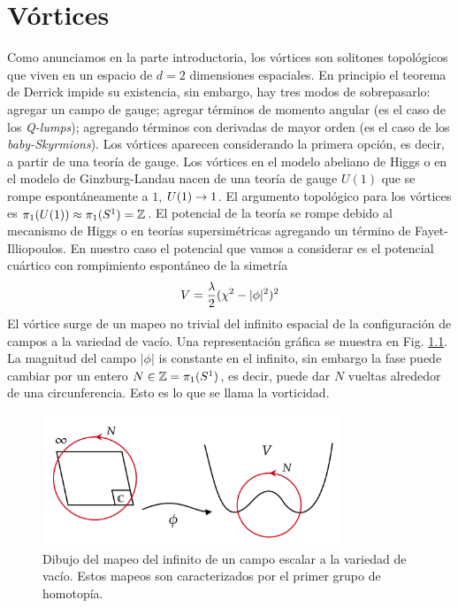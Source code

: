 
\chapter{Vórtices} %

\label{ch:ch2} %


Como anunciamos en la parte introductoria, los vórtices son solitones topológicos que viven en un espacio de $d=2$ dimensiones espaciales. En principio el teorema de Derrick impide su existencia, sin embargo, hay tres modos de sobrepasarlo: agregar un campo de gauge; agregar términos de momento angular (es el caso de los \emph{Q-lumps}); agregando términos con derivadas de mayor orden (es el caso de los \emph{baby-Skyrmions}). Los vórtices aparecen considerando la primera opción, es decir, a partir de una teoría de gauge. Los vórtices en el modelo abeliano de Higgs o en el modelo de Ginzburg-Landau nacen de una teoría de gauge $U(1)$ que se rompe espontáneamente a $1$, $U(1)\rightarrow 1$. El argumento topológico para los vórtices es $\pi_1(U(1))\approx\pi_1(S^1)=\mathbb{Z}$. El potencial de la teoría se rompe debido al mecanismo de Higgs o en teorías supersimétricas agregando un término de Fayet-Illiopoulos. En nuestro caso el potencial que vamos a considerar es el potencial cuártico con rompimiento espontáneo de la simetría
\begin{align}
	V=\frac{\lambda}{2}(\chi^2-|\phi|^2)^2
\end{align}
El vórtice surge de un mapeo no trivial del infinito espacial de la configuración de campos a la variedad de vacío. Una representación gráfica se muestra en Fig. \ref{fig:mapping}. La magnitud del campo $|\phi|$ is constante en el infinito, sin embargo la fase puede cambiar por un entero $N\in\mathbb{Z}=\pi_1(S^1)$, es decir, puede dar $N$ vueltas alrededor de una circunferencia. Esto es lo que se llama la vorticidad.

\begin{figure}[ht]
	\centering
	\includegraphics[width=0.8\textwidth]{gfx/soliton_mapping.png}
	\caption{Dibujo del mapeo del infinito de un campo escalar a la variedad de vacío. Estos mapeos son caracterizados por el primer grupo de homotopía.}
	\label{fig:mapping}
\end{figure}

